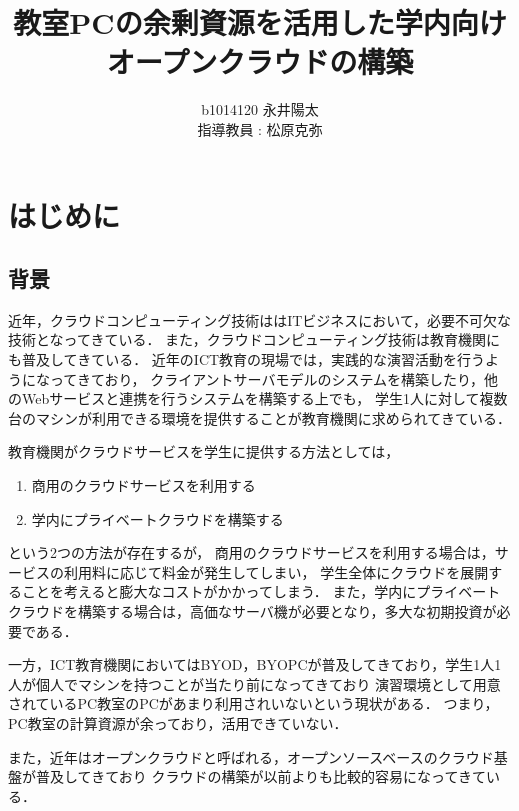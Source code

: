 \documentclass[11pt,a4paper]{jsarticle}
\author{%
b1014120 永井陽太\\指導教員 : 松原克弥
}
\title{教室PCの余剰資源を活用した学内向けオープンクラウドの構築}
\begin{document}
\maketitle

\section{はじめに}

\subsection{背景}
近年，クラウドコンピューティング技術ははITビジネスにおいて，必要不可欠な技術となってきている．
また，クラウドコンピューティング技術は教育機関にも普及してきている．
近年のICT教育の現場では，実践的な演習活動を行うようになってきており，
クライアントサーバモデルのシステムを構築したり，他のWebサービスと連携を行うシステムを構築する上でも，
学生1人に対して複数台のマシンが利用できる環境を提供することが教育機関に求められてきている．
\par 教育機関がクラウドサービスを学生に提供する方法としては，
\begin{enumerate}
	\item 商用のクラウドサービスを利用する
	\item 学内にプライベートクラウドを構築する
\end{enumerate}
という2つの方法が存在するが，
商用のクラウドサービスを利用する場合は，サービスの利用料に応じて料金が発生してしまい，
学生全体にクラウドを展開することを考えると膨大なコストがかかってしまう．
また，学内にプライベートクラウドを構築する場合は，高価なサーバ機が必要となり，多大な初期投資が必要である．
\par 一方，ICT教育機関においてはBYOD，BYOPCが普及してきており，学生1人1人が個人でマシンを持つことが当たり前になってきており
演習環境として用意されているPC教室のPCがあまり利用されいないという現状がある．
つまり，PC教室の計算資源が余っており，活用できていない．
\par また，近年はオープンクラウドと呼ばれる，オープンソースベースのクラウド基盤が普及してきており
クラウドの構築が以前よりも比較的容易になってきている．
\end{document}
